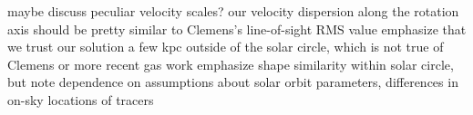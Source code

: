 maybe discuss peculiar velocity scales? our velocity dispersion along the rotation axis should be pretty similar to Clemens's line-of-sight RMS value
emphasize that we trust our solution a few kpc outside of the solar circle, which is not true of Clemens or more recent gas work
emphasize shape similarity within solar circle, but note dependence on 
assumptions about solar orbit parameters, differences in on-sky locations of tracers